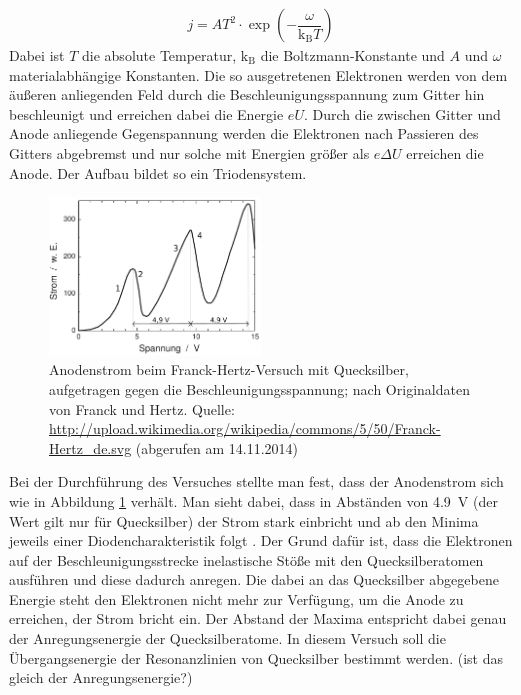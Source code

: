 \documentclass[11pt, a4paper]{article}
\begin{document}
\begin{align*}
j=AT^2\cdot \exp\left({-\dfrac{\omega}{\mathrm{k_B}T}}\right)
\end{align*}
Dabei ist $T$ die absolute Temperatur, $\mathrm{k_B}$ die Boltzmann-Konstante und $A$ und $\omega$ materialabhängige Konstanten.
Die so ausgetretenen Elektronen werden von dem äußeren anliegenden Feld durch die Beschleunigungsspannung zum Gitter hin beschleunigt und erreichen dabei die Energie $eU$.
Durch die zwischen Gitter und Anode anliegende Gegenspannung werden die Elektronen nach Passieren des Gitters abgebremst und nur solche mit Energien größer als $e\Delta U$ erreichen die Anode.
Der Aufbau bildet so ein Triodensystem.
\begin{figure}[h]
\centering
\includegraphics[width=0.5\textwidth]{./figures/franck-hertz_ergebnis.pdf}
\caption{Anodenstrom beim Franck-Hertz-Versuch mit Quecksilber, aufgetragen gegen die Beschleunigungsspannung; nach Originaldaten von Franck und Hertz. Quelle: \url{http://upload.wikimedia.org/wikipedia/commons/5/50/Franck-Hertz_de.svg} (abgerufen am 14.11.2014)}
\label{fig:franck-hertz_ergebnis}
\end{figure}
Bei der Durchführung des Versuches stellte man fest, dass der Anodenstrom sich wie in Abbildung \ref{fig:franck-hertz_ergebnis} verhält.
Man sieht dabei, dass in Abständen von \SI{4.9}{\volt} (der Wert gilt nur für Quecksilber) der Strom stark einbricht und ab den Minima jeweils einer Diodencharakteristik folgt \cite{demtroeder3}.
Der Grund dafür ist, dass die Elektronen auf der Beschleunigungsstrecke inelastische Stöße mit den Quecksilberatomen ausführen und diese dadurch anregen.
Die dabei an das Quecksilber abgegebene Energie steht den Elektronen nicht mehr zur Verfügung, um die Anode zu erreichen, der Strom bricht ein. 
Der Abstand der Maxima entspricht dabei genau der Anregungsenergie der Quecksilberatome.
In diesem Versuch soll die Übergangsenergie der Resonanzlinien von Quecksilber bestimmt werden. (ist das gleich der Anregungsenergie?)
\end{document}
